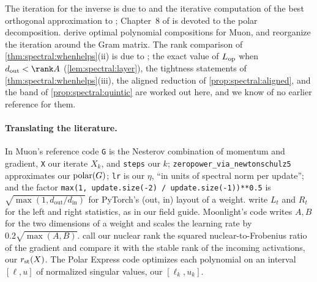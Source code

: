 \begin{refsection}
The iteration for the inverse is due to \textcite{Schulz1933} and the iterative computation of the best orthogonal approximation to \textcite{BjorckBowie1971}; Chapter~8 of \textcite{Higham2008} is devoted to the polar decomposition. \Textcite{AmselEtAl2026} derive optimal polynomial compositions for Muon, and \textcite{ZhangEtAl2026Gram} reorganize the iteration around the Gram matrix. The rank comparison of \cref{thm:spectral:whenhelps}(ii) is due to \textcite{DavisDrusvyatskiy2025}; the exact value of $L_{\mathrm{op}}$ when $d_{\mathrm{out}}<\rank A$ (\cref{lem:spectral:layer}), the tightness statements of \cref{thm:spectral:whenhelps}(iii), the aligned reduction of \cref{prop:spectral:aligned}, and the band of \cref{prop:spectral:quintic} are worked out here, and we know of no earlier reference for them.

\paragraph{Translating the literature.} In Muon's reference code \parencite{Jordan2024} \texttt{G} is the Nesterov combination of momentum and gradient, \texttt{X} our iterate $X_k$, and \texttt{steps} our $k$; \texttt{zeropower\_via\_newtonschulz5} approximates our $\operatorname{polar}(G)$; \texttt{lr} is our $\eta$, ``in units of spectral norm per update''; and the factor \texttt{max(1, update.size(-2) / update.size(-1))**0.5} is $\sqrt{\max(1,d_{\mathrm{out}}/d_{\mathrm{in}})}$ for PyTorch's (out, in) layout of a weight. \Textcite{GuptaKorenSinger2018} write $L_t$ and $R_t$ for the left and right statistics, as in our field guide. Moonlight's code writes $A,B$ for the two dimensions of a weight and scales the learning rate by $0.2\sqrt{\max(A,B)}$. \Textcite{DavisDrusvyatskiy2025} call our nuclear rank the squared nuclear-to-Frobenius ratio of the gradient and compare it with the stable rank of the incoming activations, our $r_{\mathrm{st}}(X)$. The Polar Express code \parencite{AmselEtAl2026} optimizes each polynomial on an interval $[\ell,u]$ of normalized singular values, our $[\ell_k,u_k]$.

\printchapterbib
\end{refsection}
